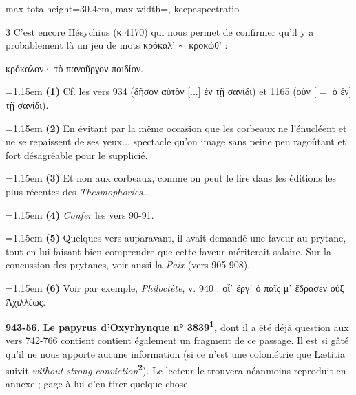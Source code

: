 \documentclass[11pt,twoside]{book}
\newcommand{\italique}[1]{\textit{#1}}
\newcommand{\citComm}[1]{\begin{quoting}[vskip=0.4pt,leftmargin=0.7em,rightmargin=0.2em]#1\end{quoting}}
\newcommand{\anglais}[1]{\textit{#1}}
\newcommand{\marqueur}[1]{\textsuperscript{\color{rubricRed}\textbf{#1}}}
\begin{document}
\begin{adjustbox}{max totalheight=30.4cm, max width=\textwidth, keepaspectratio}
\begin{minipage}{\textwidth}
{\begin{multicols}{3}
C'est encore Hésychius (κ 4170) qui nous permet de confirmer qu'il y a probablement là un jeu de mots κρόκαλ' $\sim$ κροκώθ' :
\citComm{κρόκαλον· τὸ πανοῦργον παιδίον.}
\par\vspace{1.5pt}
\par\vspace{1.2pt}\par\nopagebreak\vspace{1pt}\noindent\hangindent=1.15em {\color{sepiaNote}\textbf{(1)}} Cf. les vers 934 (δῆσον αὐτὸν [...] ἐν τῇ σανίδι) et 1165 (οὑν [$=$ ὁ ἐν] τῇ σανίδι).
\par\vspace{1.5pt}
\noindent\hangindent=1.15em {\color{sepiaNote}\textbf{(2)}} En évitant par la même occasion que les corbeaux ne l'énucléent et ne se repaissent de ses yeux... spectacle qu'on image sans peine peu ragoûtant et fort désagréable pour le supplicié.
\par\vspace{1.5pt}
\noindent\hangindent=1.15em {\color{sepiaNote}\textbf{(3)}} Et non aux corbeaux, comme on peut le lire dans les éditions les plus récentes des \italique{Thesmophories}...
\par\vspace{1.5pt}
\noindent\hangindent=1.15em {\color{sepiaNote}\textbf{(4)}} \italique{Confer} les vers 90-91.
\par\vspace{1.5pt}
\noindent\hangindent=1.15em {\color{sepiaNote}\textbf{(5)}} Quelques vers auparavant, il avait demandé une faveur au prytane, tout en lui faisant bien comprendre que cette faveur mériterait salaire. Sur la concussion des prytanes, voir aussi la \italique{Paix} (vers 905-908).
\par\vspace{1.5pt}
\noindent\hangindent=1.15em {\color{sepiaNote}\textbf{(6)}} Voir par exemple, \italique{Philoctète}, v. 940 : οἷ᾽ ἔργ᾽ ὁ παῖς μ᾽ ἔδρασεν οὑξ Ἀχιλλέως.
\par\vspace{1.5pt}
\noindent\textbf{943-56.} \textbf{Le papyrus d'Oxyrhynque n° 3839\marqueur{1},} dont il a été déjà question aux vers 742-766 contient contient également un fragment de ce passage. Il est si gâté qu'il ne nous apporte aucune information (si ce n'est une colométrie que Lætitia suivit \anglais{without strong conviction}\marqueur{2}). Le lecteur le trouvera néanmoins reproduit en annexe ; gage à lui d'en tirer quelque chose.

\end{multicols}}
\end{minipage}
\end{adjustbox}
\end{document}
